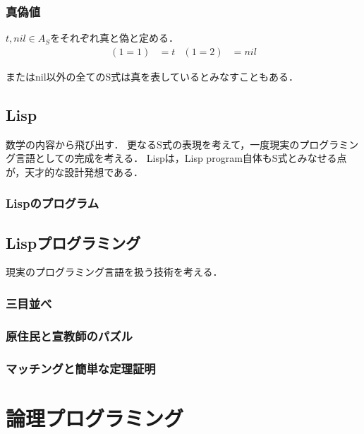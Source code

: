 \documentclass[uplatex, 12pt, dvipdfmx]{jsreport}
\begin{document}
\subsection{真偽値}

\begin{definition}
    $t,nil\in A_S$をそれぞれ真と偽と定める．
    \begin{align*}
        (1=1) &= t&
        (1=2) &= nil
    \end{align*}
\end{definition}
\begin{remark}
    またはnil以外の全てのS式は真を表しているとみなすこともある．
\end{remark}

\section{Lisp}

数学の内容から飛び出す．
更なるS式の表現を考えて，一度現実のプログラミング言語としての完成を考える．
Lispは，Lisp program自体もS式とみなせる点が，天才的な設計発想である．

\subsection{Lispのプログラム}

\section{Lispプログラミング}

現実のプログラミング言語を扱う技術を考える．

\subsection{三目並べ}

\subsection{原住民と宣教師のパズル}

\subsection{マッチングと簡単な定理証明}

\chapter{論理プログラミング}
\end{document}
